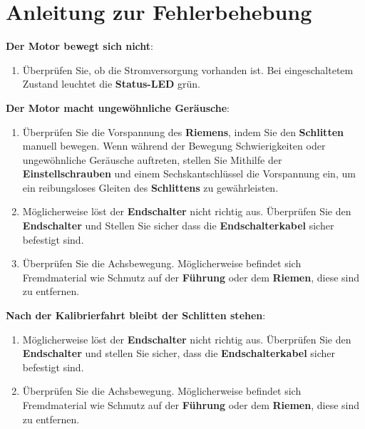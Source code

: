 %
%

\chapter{Anleitung zur Fehlerbehebung}

	
	\textbf{Der Motor bewegt sich nicht}:
	\begin{enumerate}
		\item Überprüfen Sie, ob die Stromversorgung vorhanden ist. Bei eingeschaltetem Zustand leuchtet die \textbf{Status-LED} grün.
	\end{enumerate}
		\textbf{Der Motor macht ungewöhnliche Geräusche}:
	\begin{enumerate} 
		\item Überprüfen Sie die Vorspannung des \textbf{Riemens}, indem Sie den \textbf{Schlitten} manuell bewegen. Wenn während der Bewegung Schwierigkeiten oder ungewöhnliche Geräusche auftreten, stellen Sie Mithilfe der \textbf{Einstellschrauben} und einem Sechskantschlüssel die Vorspannung ein, um ein reibungsloses Gleiten des \textbf{Schlittens} zu gewährleisten.

		\item Möglicherweise löst der \textbf{Endschalter} nicht richtig aus. Überprüfen Sie den \textbf{Endschalter} und Stellen Sie sicher dass die \textbf{Endschalterkabel} sicher befestigt sind.
				
		\item Überprüfen Sie die Achsbewegung. Möglicherweise befindet sich Fremdmaterial wie Schmutz auf der \textbf{Führung} oder dem \textbf{Riemen}, diese sind zu entfernen. 
\end{enumerate}
	\textbf{Nach der Kalibrierfahrt bleibt der Schlitten stehen}:
	\begin{enumerate}
		\item Möglicherweise löst der \textbf{Endschalter} nicht richtig aus. Überprüfen Sie den \textbf{Endschalter} und stellen Sie sicher, dass die \textbf{Endschalterkabel} sicher befestigt sind.
		\item Überprüfen Sie die Achsbewegung. Möglicherweise befindet sich Fremdmaterial wie Schmutz auf der \textbf{Führung} oder dem \textbf{Riemen}, diese sind zu entfernen. 
	\end{enumerate}